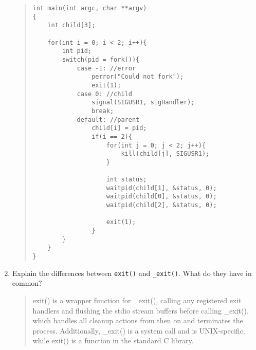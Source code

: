 \documentclass[letterpaper,10pt,onecolumn,titlepage]{article}
\begin{document}
\begin{enumerate}
\begin{quote}
\begin{verbatim}
int main(int argc, char **argv)
{
    int child[3];

    for(int i = 0; i < 2; i++){
        int pid;
        switch(pid = fork()){
            case -1: //error
                perror("Could not fork");
                exit(1);
            case 0: //child
                signal(SIGUSR1, sigHandler);
                break;
            default: //parent
                child[i] = pid;
                if(i == 2){
                    for(int j = 0; j < 2; j++){
                        kill(child[j], SIGUSR1);
                    }

                    int status;
                    waitpid(child[1], &status, 0);
                    waitpid(child[0], &status, 0);
                    waitpid(child[2], &status, 0);

                    exit(1);
                }
        }
    }
}
\end{verbatim}
\end{quote}

\item Explain the differences between \texttt{exit()} and \texttt{\_exit()}. What do they have in common?
\begin{quote}
exit() is a wrapper function for \_exit(), calling any registered exit handlers and flushing the stdio stream buffers before calling \_exit(), which handles all cleanup actions from then on and terminates the process.  Additionally, \_exit() is a system call and is UNIX-specific, while exit() is a function in the standard C library.
\end{quote}


\end{enumerate}
\end{document}
